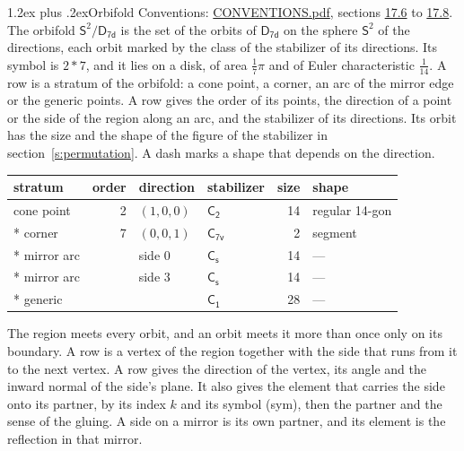 \documentclass[10pt,a4paper]{article}
\makeatletter
\renewcommand\section{\@startsection{section}{1}{\z@}{-3ex plus -1ex minus -.2ex}%
  {1.2ex plus .2ex}{\normalfont\large\sffamily\bfseries\color{parttitle}}}
\numberwithin{equation}{section}
\newcommand{\grp}[1]{\mathsf{#1}}
\newcommand{\orbname}[1]{#1}
\newcommand{\dirvec}[3]{(#1, #2, #3)}
\newcommand{\twosphere}{\mathsf{S}^{2}}
\makeatother
\begin{document}
\section{Orbifold}\label{s:orbifold}
Conventions: \href{../../CONVENTIONS.pdf}{CONVENTIONS.pdf}, sections \href{../../CONVENTIONS.pdf\#conv.17.6}{17.6} to \href{../../CONVENTIONS.pdf\#conv.17.8}{17.8}.
The orbifold $\twosphere/\grp{D_{7d}}$ is the set of the orbits of $\grp{D_{7d}}$ on the sphere $\twosphere$ of the directions, each orbit marked by the class of the stabilizer of its directions. Its symbol is $\orbname{2{\ast}7}$, and it lies on a disk, of area $\tfrac{1}{7}\pi$ and of Euler characteristic $\tfrac{1}{14}$.
\leavevmode\label{n:head.stratum}\label{n:head.order.point}\label{n:head.direction}\label{n:head.stabilizer}\label{n:head.size.orbit}\label{n:head.shape}A row is a stratum of the orbifold: a cone point, a corner, an arc of the mirror edge or the generic points. A row gives the order of its points, the direction of a point or the side of the region along an arc, and the stabilizer of its directions. Its orbit has the size and the shape of the figure of the stabilizer in section~\ref{s:permutation}. A dash marks a shape that depends on the direction.
{\small\setlength{\tabcolsep}{4pt}\begin{longtable}{@{}lrllrl@{}}\toprule
stratum & order & direction & stabilizer & size & shape\\\midrule\endhead
\bottomrule\endfoot\endlastfoot
cone point & 2 & $\dirvec{1}{0}{0}$ & \href{C2.pdf}{$\grp{C_{2}}$} & 14 & regular 14-gon\\*
corner & 7 & $\dirvec{0}{0}{1}$ & \href{C7v.pdf}{$\grp{C_{7v}}$} & 2 & segment\\*
mirror arc &  & side 0 & \href{C1v.pdf}{$\grp{C_{s}}$} & 14 & ---\\*
mirror arc &  & side 3 & \href{C1v.pdf}{$\grp{C_{s}}$} & 14 & ---\\*
generic &  &  & \href{C1.pdf}{$\grp{C_{1}}$} & 28 & ---\\
\bottomrule\end{longtable}}
\leavevmode\label{n:head.vertex.region}\label{n:head.angle}\label{n:head.normal.side}\label{n:head.partner}\label{n:head.sense}The region meets every orbit, and an orbit meets it more than once only on its boundary. A row is a vertex of the region together with the side that runs from it to the next vertex. A row gives the direction of the vertex, its angle and the inward normal of the side's plane. It also gives the element that carries the side onto its partner, by its index $k$ and its symbol (sym), then the partner and the sense of the gluing. A side on a mirror is its own partner, and its element is the reflection in that mirror.
\end{document}
